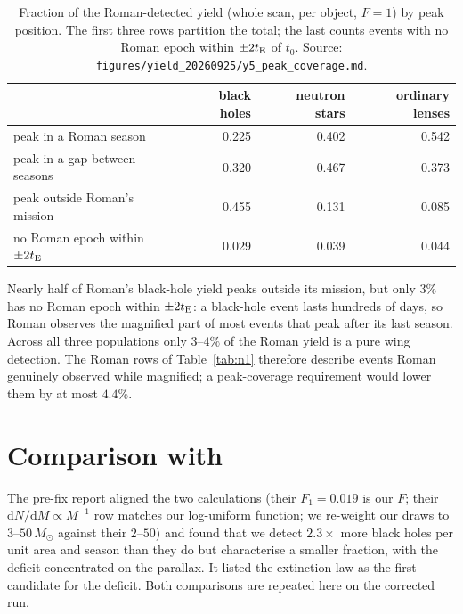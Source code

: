 \documentclass[english,10pt,a4paper]{article}
\newcommand{\tE}{t_{\rm E}}
\newcommand{\Msun}{M_\odot}
\begin{document}
\begin{table}[h]
\centering
\caption{Fraction of the Roman-detected yield (whole scan, per object, $F=1$) by peak position.
The first three rows partition the total; the last counts events with no Roman epoch within
$\pm2\tE$ of $t_0$. Source: \texttt{figures/yield\_20260925/y5\_peak\_coverage.md}.}
\label{tab:peak}
\begin{tabular}{lrrr}
\toprule
 & black holes & neutron stars & ordinary lenses \\
\midrule
peak in a Roman season            & 0.225 & 0.402 & 0.542 \\
peak in a gap between seasons     & 0.320 & 0.467 & 0.373 \\
peak outside Roman's mission      & 0.455 & 0.131 & 0.085 \\
\midrule
no Roman epoch within $\pm2\tE$   & 0.029 & 0.039 & 0.044 \\
\bottomrule
\end{tabular}
\end{table}

Nearly half of Roman's black-hole yield peaks outside its mission, but only $3\%$ has no Roman epoch
within $\pm2\tE$: a black-hole event lasts hundreds of days, so Roman observes the magnified part
of most events that peak after its last season. Across all three populations only $3$--$4\%$ of the
Roman yield is a pure wing detection. The Roman rows of Table~\ref{tab:n1} therefore describe events
Roman genuinely observed while magnified; a peak-coverage requirement would lower them by at most
$4.4\%$.

\section{Comparison with \texorpdfstring{\citet{SajadianSahu2023}}{Sajadian \& Sahu (2023)}}

The pre-fix report aligned the two calculations (their $F_1=0.019$ is our $F$; their
$\mathrm{d}N/\mathrm{d}M\propto M^{-1}$ row matches our log-uniform function; we re-weight our
draws to $3$--$50\,\Msun$ against their $2$--$50$) and found that we detect $2.3\times$ more black
holes per unit area and season than they do but characterise a smaller fraction, with the deficit
concentrated on the parallax. It listed the extinction law as the first candidate for the
deficit. Both comparisons are repeated here on the corrected run.
\end{document}
